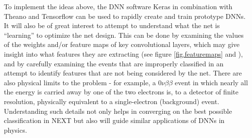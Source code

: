 \documentclass[11pt,a4paper]{article}
\begin{document}
To implement the ideas above, the DNN software Keras \cite{Keras} in combination with Theano \cite{Theano} and Tensorflow \cite{Tensorflow} can be used to rapidly create and train prototype DNNs. It will also be of great interest to attempt to understand what the net is ``learning'' to optimize the net design. This can be done by examining the values of the weights and/or feature maps of key convolutional layers, which may give insight into what features they are extracting (see figure \ref{fig.featuremaps} and \cite{Aurisano_2016}), and by carefully examining the events that are improperly classified in an attempt to identify features that are not being considered by the net. There are also physical limits to the problem - for example, a $0\nu\beta\beta$ event in which nearly all the energy is carried away by one of the two electrons is, to a detector of finite resolution, physically equivalent to a single-electron (background) event. Understanding such details not only helps in converging on the best possible classification in NEXT but also will guide similar applications of DNNs in physics.
\end{document}
